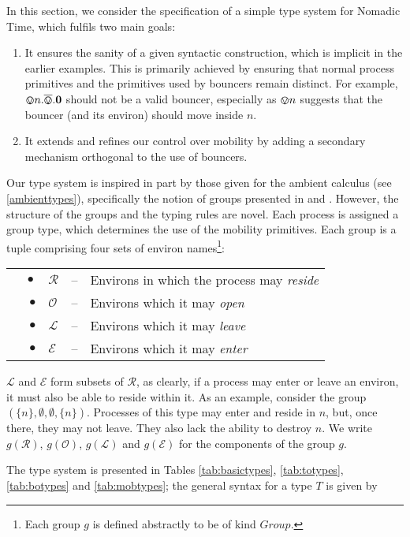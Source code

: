 In this section, we consider the specification of a simple type
system for Nomadic Time, which fulfils two main goals:

\begin{enumerate}
\item It ensures the sanity of a given syntactic construction, which
  is implicit in the earlier examples.  This is primarily achieved by
  ensuring that normal process primitives and the primitives used by
  bouncers remain distinct.  For example, $\varovee n.\overline{\varovee}.\textbf{0}$ should
  not be a valid bouncer, especially as $\varovee n$ suggests that the
  bouncer (and its environ) should move inside $n$.
\item It extends and refines our control over mobility by adding a
      secondary mechanism orthogonal to the use of bouncers.
\end{enumerate}

Our type system is inspired in part by those given for the ambient
calculus (see \ref{ambienttypes}), specifically the notion of groups
presented in \cite{ambienttypes} and \cite{m3}.  However, the
structure of the groups and the typing rules are novel.  Each process
is assigned a group type, which determines the use of the mobility
primitives.  Each group is a tuple comprising four sets of environ
names\footnote{Each group $g$ is defined abstractly to be of kind
  $Group$.}:

\begin{tabular}{rlcl}
$\quad \bullet$ & $\mathscr{R}$ & -- & Environs in which the process may
 \emph{reside} \\
$\bullet$ & $\mathscr{O}$ & -- & Environs which it may \emph{open} \\
$\bullet$ & $\mathscr{L}$ & -- & Environs which it may \emph{leave} \\
$\bullet$ & $\mathscr{E}$ & -- & Environs which it may \emph{enter}
\end{tabular}

$\mathscr{L}$ and $\mathscr{E}$ form subsets of $\mathscr{R}$, as
clearly, if a process may enter or leave an environ, it must also be able
to reside within it.  As an example, consider the group
$(\{n\},\emptyset, \emptyset,\{n\})$.  Processes of this type may enter
and reside in $n$, but, once there, they may not leave.  They also lack
the ability to destroy $n$.  We write $g(\mathscr{R})$,
$g(\mathscr{O})$, $g(\mathscr{L})$ and $g(\mathscr{E})$ for the
components of the group $g$.

The type system is presented in Tables \ref{tab:basictypes},
\ref{tab:totypes}, \ref{tab:botypes} and \ref{tab:mobtypes}; the
general syntax for a type $T$ is given by

